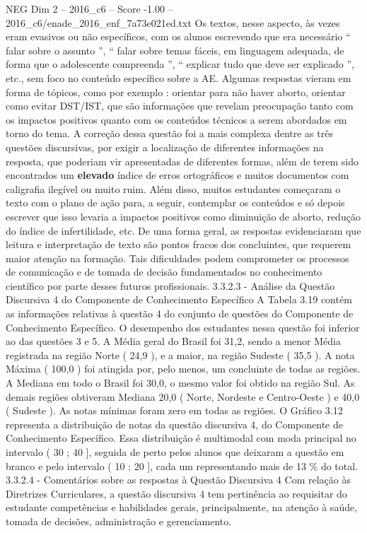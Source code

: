 \begin{textsample}{NEG Dim 2 – 2016\_c6 – Score -1.00 – 2016\_c6/enade\_2016\_enf\_7a73e021ed.txt}
Os textos, nesse aspecto, às vezes eram evasivos ou não específicos, com os alunos escrevendo que era necessário “ falar sobre o assunto ”, “ falar sobre temas fáceis, em linguagem adequada, de forma que o adolescente compreenda ”, “ explicar tudo que deve ser explicado ”, etc., sem foco no conteúdo específico sobre a AE.
Algumas respostas vieram em forma de tópicos, como por exemplo : orientar para não haver aborto, orientar como evitar DST/IST, que são informações que revelam preocupação tanto com os impactos positivos quanto com os conteúdos técnicos a serem abordados em torno do tema.
A correção dessa questão foi a mais complexa dentre as três questões discursivas, por exigir a localização de diferentes informações na resposta, que poderiam vir apresentadas de diferentes formas, além de terem sido encontrados um \textbf{elevado} índice de erros ortográficos e muitos documentos com caligrafia ilegível ou muito ruim.
Além disso, muitos estudantes começaram o texto com o plano de ação para, a seguir, contemplar os conteúdos e só depois escrever que isso levaria a impactos positivos como diminuição de aborto, redução do índice de infertilidade, etc.
De uma forma geral, as respostas evidenciaram que leitura e interpretação de texto são pontos fracos dos concluintes, que requerem maior atenção na formação.
Tais dificuldades podem comprometer os processos de comunicação e de tomada de decisão fundamentados no conhecimento científico por parte desses futuros profissionais. 3.3.2.3 - Análise da Questão Discursiva 4 do Componente de Conhecimento Específico A Tabela 3.19 contém as informações relativas à questão 4 do conjunto de questões do Componente de Conhecimento Específico.
O desempenho dos estudantes nessa questão foi inferior ao das questões 3 e 5.
A Média geral do Brasil foi 31,2, sendo a menor Média registrada na região Norte ( 24,9 ), e a maior, na região Sudeste ( 35,5 ).
A nota Máxima ( 100,0 ) foi atingida por, pelo menos, um concluinte de todas as regiões.
A Mediana em todo o Brasil foi 30,0, o mesmo valor foi obtido na região Sul.
As demais regiões obtiveram Mediana 20,0 ( Norte, Nordeste e Centro-Oeste ) e 40,0 ( Sudeste ).
As notas mínimas foram zero em todas as regiões.
O Gráfico 3.12 representa a distribuição de notas da questão discursiva 4, do Componente de Conhecimento Específico.
Essa distribuição é multimodal com moda principal no intervalo ( 30 ; 40 ], seguida de perto pelos alunos que deixaram a questão em branco e pelo intervalo ( 10 ; 20 ], cada um representando mais de 13 \% do total. 3.3.2.4 - Comentários sobre as respostas à Questão Discursiva 4 Com relação às Diretrizes Curriculares, a questão discursiva 4 tem pertinência ao requisitar do estudante competências e habilidades gerais, principalmente, na atenção à saúde, tomada de decisões, administração e gerenciamento.

\end{textsample}
